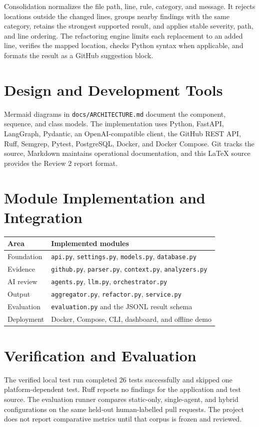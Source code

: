 \documentclass[11pt,a4paper]{article}
\begin{document}
Consolidation normalizes the file path, line, rule, category, and message. It rejects locations outside the changed lines, groups nearby findings with the same category, retains the strongest supported result, and applies stable severity, path, and line ordering. The refactoring engine limits each replacement to an added line, verifies the mapped location, checks Python syntax when applicable, and formats the result as a GitHub suggestion block.

\section{Design and Development Tools}
Mermaid diagrams in \texttt{docs/ARCHITECTURE.md} document the component, sequence, and class models. The implementation uses Python, FastAPI, LangGraph, Pydantic, an OpenAI-compatible client, the GitHub REST API, Ruff, Semgrep, Pytest, PostgreSQL, Docker, and Docker Compose. Git tracks the source, Markdown maintains operational documentation, and this LaTeX source provides the Review 2 report format.

\section{Module Implementation and Integration}
\begin{table}[h]
\centering
\begin{tabular}{ll}
\toprule
Area & Implemented modules \\
\midrule
Foundation & \texttt{api.py}, \texttt{settings.py}, \texttt{models.py}, \texttt{database.py} \\
Evidence & \texttt{github.py}, \texttt{parser.py}, \texttt{context.py}, \texttt{analyzers.py} \\
AI review & \texttt{agents.py}, \texttt{llm.py}, \texttt{orchestrator.py} \\
Output & \texttt{aggregator.py}, \texttt{refactor.py}, \texttt{service.py} \\
Evaluation & \texttt{evaluation.py} and the JSONL result schema \\
Deployment & Docker, Compose, CLI, dashboard, and offline demo \\
\bottomrule
\end{tabular}
\end{table}

\section{Verification and Evaluation}
The verified local test run completed 26 tests successfully and skipped one platform-dependent test. Ruff reports no findings for the application and test source. The evaluation runner compares static-only, single-agent, and hybrid configurations on the same held-out human-labelled pull requests. The project does not report comparative metrics until that corpus is frozen and reviewed.
\end{document}
